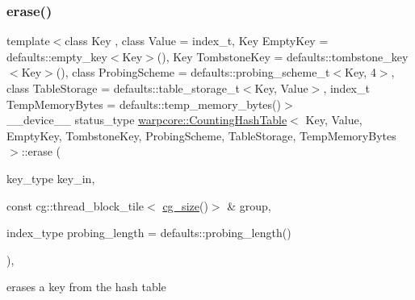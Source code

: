 \subsubsection{\texorpdfstring{erase()}{erase()}\hspace{0.1cm}{\footnotesize\ttfamily [1/2]}}
{\footnotesize\ttfamily template$<$class Key , class Value  = index\+\_\+t, Key Empty\+Key = defaults\+::empty\+\_\+key$<$\+Key$>$(), Key Tombstone\+Key = defaults\+::tombstone\+\_\+key$<$\+Key$>$(), class Probing\+Scheme  = defaults\+::probing\+\_\+scheme\+\_\+t$<$\+Key, 4$>$, class Table\+Storage  = defaults\+::table\+\_\+storage\+\_\+t$<$\+Key, Value$>$, index\+\_\+t Temp\+Memory\+Bytes = defaults\+::temp\+\_\+memory\+\_\+bytes()$>$ \\
\+\_\+\+\_\+device\+\_\+\+\_\+ status\+\_\+type \hyperlink{classwarpcore_1_1CountingHashTable}{warpcore\+::\+Counting\+Hash\+Table}$<$ Key, Value, Empty\+Key, Tombstone\+Key, Probing\+Scheme, Table\+Storage, Temp\+Memory\+Bytes $>$\+::erase (\begin{DoxyParamCaption}\item[{key\+\_\+type}]{key\+\_\+in,  }\item[{const cg\+::thread\+\_\+block\+\_\+tile$<$ \hyperlink{classwarpcore_1_1CountingHashTable_aeaf1b333eb176da987dee4d003e5dddc}{cg\+\_\+size}()$>$ \&}]{group,  }\item[{index\+\_\+type}]{probing\+\_\+length = {\ttfamily defaults\+:\+:probing\+\_\+length()} }\end{DoxyParamCaption})\hspace{0.3cm}{\ttfamily [inline]}, {\ttfamily [noexcept]}}



erases a key from the hash table 


